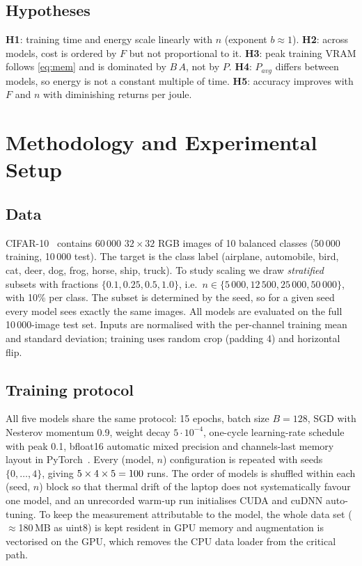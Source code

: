 \documentclass[conference]{IEEEtran}
\begin{document}
\subsection{Hypotheses}
\textbf{H1}: training time and energy scale linearly with $n$ (exponent $b\approx1$).
\textbf{H2}: across models, cost is ordered by $F$ but not proportional to it.
\textbf{H3}: peak training VRAM follows \eqref{eq:mem} and is dominated by $B\,A$, not by $P$.
\textbf{H4}: $P_{avg}$ differs between models, so energy is not a constant multiple of time.
\textbf{H5}: accuracy improves with $F$ and $n$ with diminishing returns per joule.

\section{Methodology and Experimental Setup}
\subsection{Data}
CIFAR-10~\cite{krizhevsky2009cifar} contains 60\,000 $32\times32$ RGB images of 10 balanced classes
(50\,000 training, 10\,000 test). The target is the class label (airplane, automobile, bird, cat, deer, dog, frog,
horse, ship, truck). To study scaling we draw \emph{stratified} subsets with fractions
$\{0.1, 0.25, 0.5, 1.0\}$, i.e.\ $n\in\{5\,000, 12\,500, 25\,000, 50\,000\}$, with 10\% per class. The subset is
determined by the seed, so for a given seed every model sees exactly the same images. All models are evaluated on the
full 10\,000-image test set. Inputs are normalised with the per-channel training mean and standard deviation; training
uses random crop (padding 4) and horizontal flip.

\subsection{Training protocol}
All five models share the same protocol: 15 epochs, batch size $B=128$, SGD with Nesterov momentum 0.9,
weight decay $5\cdot10^{-4}$, one-cycle learning-rate schedule~\cite{smith2019onecycle} with peak 0.1, bfloat16
automatic mixed precision and channels-last memory layout in PyTorch~\cite{paszke2019pytorch}. Every
(model, $n$) configuration is repeated with seeds $\{0,\dots,4\}$, giving
$5\times4\times5=100$ runs. The order of models is shuffled within each (seed, $n$) block so that thermal drift of
the laptop does not systematically favour one model, and an unrecorded warm-up run initialises CUDA and cuDNN
auto-tuning. To keep the measurement attributable to the model, the whole data set ($\approx$180\,MB as uint8) is kept
resident in GPU memory and augmentation is vectorised on the GPU, which removes the CPU data loader from the critical path.
\end{document}
